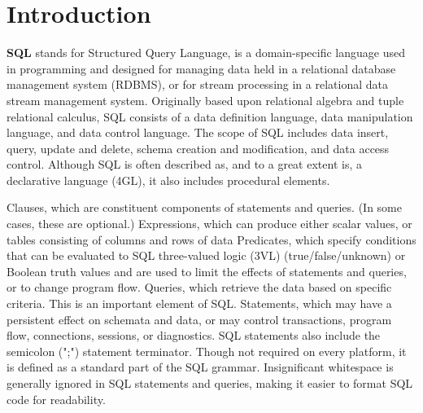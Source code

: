 \section*{Introduction}

\textbf{SQL} stands for Structured Query Language, is a domain-specific language used in programming and designed for managing data held in a relational database management system (RDBMS), or for stream processing in a relational data stream management system. Originally based upon relational algebra and tuple relational calculus, SQL consists of a data definition language, data manipulation language, and data control language. The scope of SQL includes data insert, query, update and delete, schema creation and modification, and data access control. Although SQL is often described as, and to a great extent is, a declarative language (4GL), it also includes procedural elements.

Clauses, which are constituent components of statements and queries. (In some cases, these are optional.)
Expressions, which can produce either scalar values, or tables consisting of columns and rows of data
Predicates, which specify conditions that can be evaluated to SQL three-valued logic (3VL) (true/false/unknown) or Boolean truth values and are used to limit the effects of statements and queries, or to change program flow.
Queries, which retrieve the data based on specific criteria. This is an important element of SQL.
Statements, which may have a persistent effect on schemata and data, or may control transactions, program flow, connections, sessions, or diagnostics.
SQL statements also include the semicolon (";") statement terminator. Though not required on every platform, it is defined as a standard part of the SQL grammar.
Insignificant whitespace is generally ignored in SQL statements and queries, making it easier to format SQL code for readability.

\clearpage